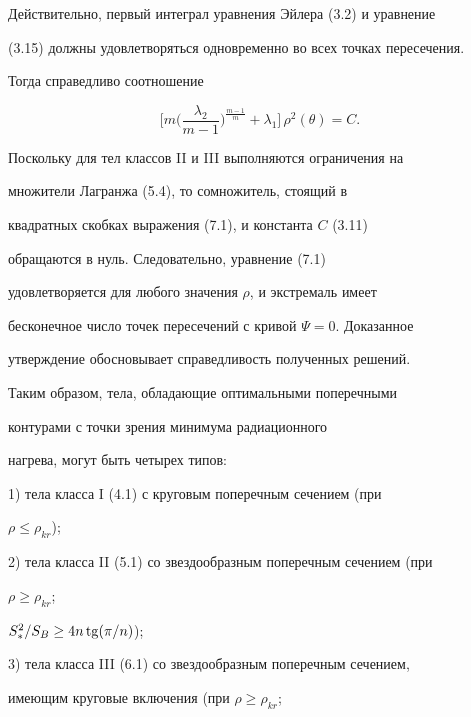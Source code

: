 Действительно, первый интеграл уравнения Эйлера (3.2) и уравнение


(3.15) должны удовлетворяться одновременно во всех точках пересечения.


Тогда справедливо соотношение


\begin{equation}


\bigg[ m \bigg( \frac {\lambda_2}{m-1} \bigg)^{\frac {m-1}{m}} +


\lambda_1 \bigg] \, \rho^2 (\theta) = C.


\end{equation}


Поскольку для тел классов II и III выполняются ограничения на


множители Лагранжа (5.4), то сомножитель, стоящий в


квадратных скобках выражения (7.1), и константа $C$ (3.11)


обращаются в нуль. Следовательно, уравнение (7.1)


удовлетворяется для любого значения $\rho$, и экстремаль имеет


бесконечное число точек пересечений с кривой $\Psi=0$. Доказанное


утверждение обосновывает справедливость полученных решений.





Таким образом, тела, обладающие оптимальными поперечными


контурами с точки зрения минимума радиационного


нагрева, могут быть четырех типов:





1) тела класса I (4.1) с круговым поперечным сечением (при


$\rho \leq \rho_{kr}$);





2) тела класса II (5.1) со звездообразным поперечным сечением (при


$\rho \geq \rho_{kr}$;


$S^2_* / S_B \geq 4n  \operatorname{tg} (\pi / n )$);





3) тела класса III (6.1) со звездообразным поперечным сечением,


имеющим круговые включения (при $\rho \geq \rho_{kr}$;


